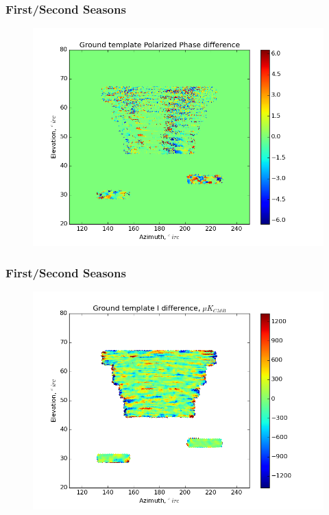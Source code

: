 \documentclass{beamer}
\begin{document}

\begin{frame}
\frametitle{First/Second Seasons}
\begin{figure}
\includegraphics[width=0.9\linewidth]{dArg_gt_FIRST_SECOND.png}
\end{figure}
\end{frame}

\begin{frame}
\frametitle{First/Second Seasons}
\begin{figure}
\includegraphics[width=0.9\linewidth]{dI_gt_FIRST_SECOND.png}
\end{figure}
\end{frame}
\end{document}
